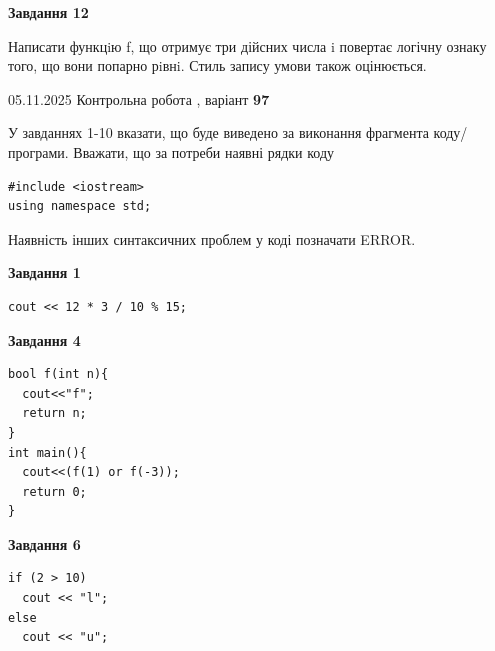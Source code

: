 \documentclass[12pt, ukrainian]{article}
\begin{document}
{\begin {large}
\begin{minipage}[t]{11.0cm}
\begin{center}
\textbf{Завдання 12}
\end{center}

Написати функцiю f, що отримує три дійсних числа i повертає логічну ознаку того, що вони попарно рiвнi. Стиль запису умови також оцінюється.\par

\end{minipage}

\end {large}}
\newpage

{\Large{05.11.2025 Контрольна робота , варіант  \No \textbf { 97 }\par}}
{
\begin {large}
У завданнях 1-10 вказати, що буде виведено за виконання фрагмента коду/про\-гра\-ми.
Вважати, що за потреби наявні рядки коду
\begin{verbatim}
#include <iostream>
using namespace std;
\end{verbatim}
Наявність інших синтаксичних проблем у коді позначати ERROR.

\begin{minipage}[t]{7.0cm}

\begin{center}
\textbf{Завдання 1}
\end{center}
\vspace{-8mm}

\begin{verbatim}
cout << 12 * 3 / 10 % 15;
\end{verbatim}



\begin{center}
\textbf{Завдання 4}
\end{center}
\vspace{-8mm}

\begin{verbatim}
bool f(int n){
  cout<<"f";
  return n;
}
int main(){
  cout<<(f(1) or f(-3));
  return 0;
}
\end{verbatim}



\begin{center}
\textbf{Завдання 6}
\end{center}
\vspace{-8mm}

\begin{verbatim}
if (2 > 10)
  cout << "l";
else
  cout << "u";
\end{verbatim}




\end{minipage}
\end{large}}
\end{document}
